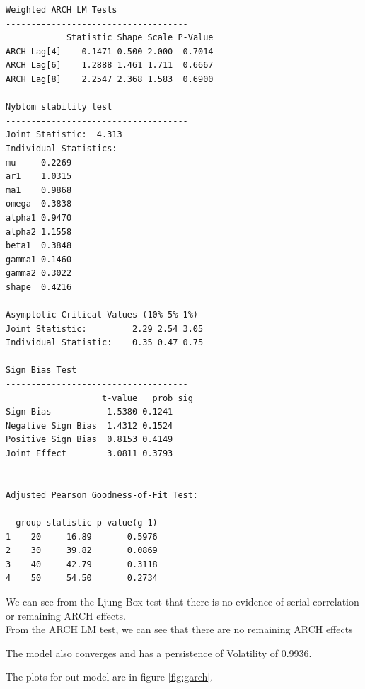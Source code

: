 \documentclass{article}
\begin{document}
\begin{verbatim}
Weighted ARCH LM Tests
------------------------------------
            Statistic Shape Scale P-Value
ARCH Lag[4]    0.1471 0.500 2.000  0.7014
ARCH Lag[6]    1.2888 1.461 1.711  0.6667
ARCH Lag[8]    2.2547 2.368 1.583  0.6900

Nyblom stability test
------------------------------------
Joint Statistic:  4.313
Individual Statistics:             
mu     0.2269
ar1    1.0315
ma1    0.9868
omega  0.3838
alpha1 0.9470
alpha2 1.1558
beta1  0.3848
gamma1 0.1460
gamma2 0.3022
shape  0.4216

Asymptotic Critical Values (10% 5% 1%)
Joint Statistic:     	 2.29 2.54 3.05
Individual Statistic:	 0.35 0.47 0.75

Sign Bias Test
------------------------------------
                   t-value   prob sig
Sign Bias           1.5380 0.1241    
Negative Sign Bias  1.4312 0.1524    
Positive Sign Bias  0.8153 0.4149    
Joint Effect        3.0811 0.3793    


Adjusted Pearson Goodness-of-Fit Test:
------------------------------------
  group statistic p-value(g-1)
1    20     16.89       0.5976
2    30     39.82       0.0869
3    40     42.79       0.3118
4    50     54.50       0.2734
\end{verbatim}

\noindent We can see from the Ljung-Box test that there is no evidence of serial correlation or remaining ARCH effects. \\

\noindent From the ARCH LM test, we can see that there are no remaining ARCH effects

\noindent The model also converges and has a persistence of Volatility of $0.9936$.

\noindent The plots for out model are in figure \ref{fig:garch}.

\clearpage
\end{document}
